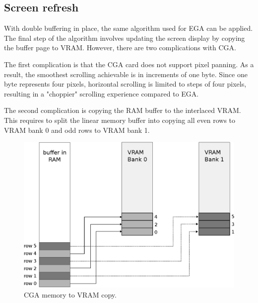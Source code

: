 \documentclass[book.tex]{subfiles}
\begin{document}
\pagebreak
\subsection{Screen refresh}
With double buffering in place, the same algorithm used for EGA can be applied. The final step of the algorithm involves updating the screen display by copying the buffer page to VRAM. However, there are two complications with CGA.\\

\par
The first complication is that the CGA card does not support pixel panning. As a result, the smoothest scrolling achievable is in increments of one byte. Since one byte represents four pixels, horizontal scrolling is limited to steps of four pixels, resulting in a "choppier" scrolling experience compared to EGA. \\

\par
\begin{minipage}{\textwidth}
  
\end{minipage}
\label{state_type}

\par
The second complication is copying the RAM buffer to the interlaced VRAM. This requires to split the linear memory buffer into copying all even rows to VRAM bank 0 and odd rows to VRAM bank 1.\\

\begin{figure}[H]
\centering
\includegraphics[width=1.0\textwidth]{imgs/drawings/cga_VRAM_copy.eps}
\caption{CGA memory to VRAM copy.}
\label{fig:cga_interlaced}
\end{figure}
\end{document}
